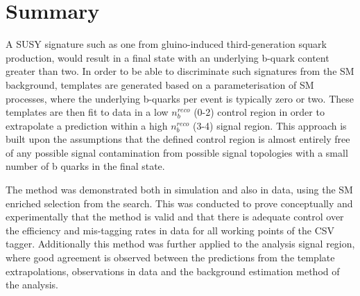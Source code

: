 \section{Summary}
\label{subsec:templateconclusions}

A \ac{SUSY} signature such as one from gluino-induced third-generation squark production, would result in a final state with an underlying b-quark content greater than two. In order to be able to discriminate such signatures from the \ac{SM} background, templates are generated based on a parameterisation of \ac{SM} processes, where the underlying b-quarks per event is typically zero or two. These templates are then fit to data in a low $n_{b}^{reco}$ (0-2) control region in order to extrapolate a prediction within a high $n_{b}^{reco}$ (3-4) signal region. This approach is built upon the assumptions that the defined control region is almost entirely free of any possible signal contamination from possible signal topologies with a small number of b quarks in the final state.

The method was demonstrated both in simulation and also in data, using the \ac{SM} enriched \mupjets selection from the \alphat search. This was conducted to prove conceptually and experimentally that the method is valid and that there is adequate control over the efficiency and mis-tagging rates in data for all working points of the \ac{CSV} tagger. Additionally this method was further applied to the \alphat analysis signal region, where good agreement is observed between the predictions from the template extrapolations, observations in data and the background estimation method of the \alphat analysis.

